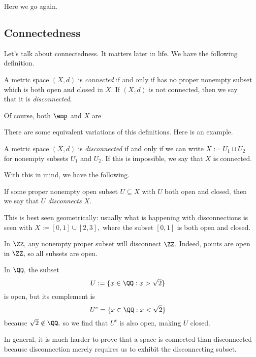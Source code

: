 













Here we go again.

\subsection{Connectedness}
Let's talk about connectedness. It matters later in life. We have the following definition.
\begin{definition}[Connected, I]
	A metric space $(X,d)$ is \textit{connected} if and only if has no proper nonempty subset which is both open and closed in $X.$ If $(X,d)$ is not connected, then we say that it is \textit{disconnected}.
\end{definition}
\begin{remark}
	Of course, both $\emp$ and $X$ are 
\end{remark}
There are some equivalent variations of this definitions. Here is an example.
\begin{definition}[Connected, II]
	A metric space $(X,d)$ is \textit{disconnected} if and only if we can write $X:=U_1\sqcup U_2$ for nonempty subsets $U_1$ and $U_2.$ If this is impossible, we say that $X$ is connected.
\end{definition}
With this in mind, we have the following.
\begin{definition}
	If some proper nonempty open subset $U\subseteq X$ with $U$ both open and closed, then we say that $U$ \textit{disconnects} $X.$
\end{definition}
\begin{remark}
	This is best seen geometrically: usually what is happening with disconnections is seen with $X:=[0,1]\cup[2,3],$ where the subset $[0,1]$ is both open and closed.
\end{remark}
\begin{example}
	In $\ZZ,$ any nonempty proper subset will disconnect $\ZZ.$ Indeed, points are open in $\ZZ,$ so all subsets are open.
\end{example}
\begin{example}
	In $\QQ,$ the subset
	\[U:=\{x\in\QQ:x>\sqrt2\}\]
	is open, but its complement is
	\[U^c=\{x\in\QQ:x<\sqrt2\}\]
	because $\sqrt2\notin\QQ,$ so we find that $U^c$ is also open, making $U$ closed.
\end{example}
In general, it is much harder to prove that a space is connected than disconnected because disconnection merely requires us to exhibit the disconnecting subset.

